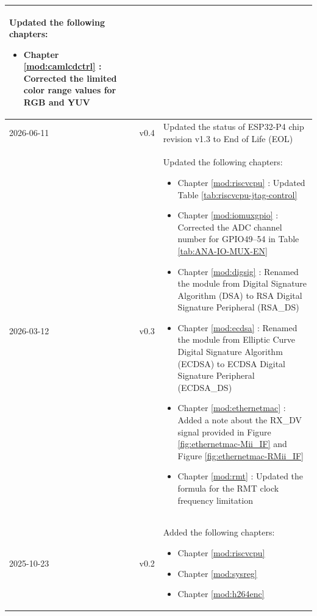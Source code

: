 \begin{longtable}[l]{ | m{2cm} | m{1.5cm} | m{12cm} | }
    Updated the following chapters:
    \begin{itemize}
        \item Chapter \ref{mod:camlcdctrl} \textit{\nameref{mod:camlcdctrl}}: Corrected the limited color range values for RGB and YUV
    \end{itemize}
    \\\hline
    2026-06-11 & v0.4 &
    Updated the status of ESP32-P4 chip revision v1.3 to End of Life (EOL)
    \\\hline
    2026-03-12 & v0.3 &
    Updated the following chapters:
    \begin{itemize}
        \item Chapter \ref{mod:riscvcpu} \textit{\nameref{mod:riscvcpu}}: Updated Table \ref{tab:riscvcpu-jtag-control}
        \item Chapter \ref{mod:iomuxgpio} \textit{\nameref{mod:iomuxgpio}}: Corrected the ADC channel number for GPIO49–54 in Table \ref{tab:ANA-IO-MUX-EN} \textit{\nameref{tab:ANA-IO-MUX-EN}} %
        \item Chapter \ref{mod:digsig} \textit{\nameref{mod:digsig}}: Renamed the module from Digital Signature Algorithm (DSA) to RSA Digital Signature Peripheral (RSA\_DS) %
        \item Chapter \ref{mod:ecdsa} \textit{\nameref{mod:ecdsa}}: Renamed the module from Elliptic Curve Digital Signature Algorithm (ECDSA) to ECDSA Digital Signature Peripheral (ECDSA\_DS) %
        \item Chapter \ref{mod:ethernetmac} \textit{\nameref{mod:ethernetmac}}: Added a note about the RX\_DV signal provided in Figure \ref{fig:ethernetmac-Mii_IF} and Figure \ref{fig:ethernetmac-RMii_IF} %
        \item Chapter \ref{mod:rmt} \textit{\nameref{mod:rmt}}: Updated the formula for the RMT clock frequency limitation %
    \end{itemize}
    \\\hline
    2025-10-23 & v0.2 &
    Added the following chapters:
    \begin{itemize}
        \item Chapter \ref{mod:riscvcpu} \textit{\nameref{mod:riscvcpu}}
        \item Chapter \ref{mod:sysreg} \textit{\nameref{mod:sysreg}}
        \item Chapter \ref{mod:h264enc} \textit{\nameref{mod:h264enc}}
    \end{itemize}


\end{longtable}
